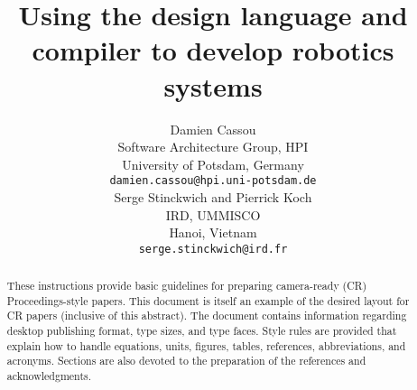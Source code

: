 \documentclass[letterpaper, 10 pt, conference]{ieeeconf}  %
\title{Using the \diaspec{} design language and compiler to develop
  robotics systems}
\author{%
  \parbox{3 in}{\centering Damien Cassou\\
    Software Architecture Group, HPI\\
    University of Potsdam, Germany\\%
    {\tt\small damien.cassou@hpi.uni-potsdam.de}}
  \hspace*{ 0.5 in}
  \parbox{3 in}{ \centering Serge Stinckwich and Pierrick Koch\\
    IRD, UMMISCO\\
    Hanoi, Vietnam\\
    {\tt\small serge.stinckwich@ird.fr}}
}
\begin{document}
\maketitle
\thispagestyle{empty}
\pagestyle{empty}


\begin{abstract}

These instructions provide basic guidelines for preparing camera-ready (CR)
Proceedings-style papers. This document is itself an example of the
desired layout for CR papers (inclusive of this abstract). The document
contains information regarding desktop publishing format, type sizes, and
type faces. Style rules are provided that explain how to handle equations,
units, figures, tables, references, abbreviations, and acronyms. Sections
are also devoted to the preparation of the references and acknowledgments.

\end{abstract}



\end{document}
